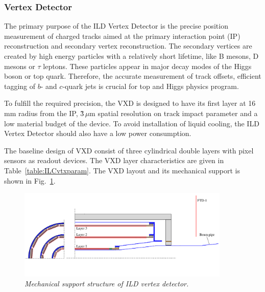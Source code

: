 \subsubsection{Vertex Detector}
The primary purpose of the ILD Vertex Detector is the precise position measurement of charged tracks aimed at the primary interaction point (IP) reconstruction and secondary vertex reconstruction.
The secondary vertices are created by high energy particles with a relatively short lifetime, like B mesons, D mesons or $\tau$ leptons. These particles appear in major decay modes of the Higgs boson or top quark. Therefore, the accurate measurement of track offsets, efficient tagging of $b$- and $c$-quark jets is crucial for top and Higgs physics program. %

To fulfill the required precision, the VXD is designed to have its first layer at 16\,mm radius from the IP, \~3\,$\mu$m spatial resolution on track impact parameter and a low material budget of the device. To avoid installation of liquid cooling, the ILD Vertex Detector should also have a low power consumption.

The baseline design of VXD consist of three cylindrical double layers with pixel sensors as readout devices. The VXD layer characteristics are given in Table~\ref{table:ILCvtxparam}.
The VXD layout and its mechanical support is shown in Fig.~\ref{fig:ILCvtxsupport}. 



\begin{figure}
\centering

    \includegraphics[width=0.9\textwidth]{graphics/ILCvtxsupport.png}
    \caption{\sl Mechanical support structure of ILD vertex detector.}
    \label{fig:ILCvtxsupport}


\end{figure}

